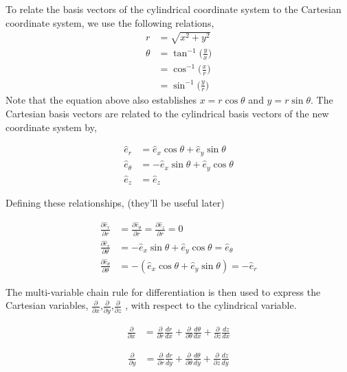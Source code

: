 To relate the basis vectors of the cylindrical coordinate system to the Cartesian coordinate system, we use the following relations,
\begin{align*}
	r 
	&= \sqrt{x^2 + y^2} \\
	\theta 
	&= \tan^{-1} \Big( \frac{y}{x} \Big) \\
	&= \cos^{-1} \Big( \frac{x}{r} \Big) \\
	&=\sin^{-1} \Big( \frac{y}{r} \Big)		
\end{align*}
	Note that the equation above also establishes $x   = r\cos \theta$ and $y = r\sin\theta$. The Cartesian basis vectors are related to the cylindrical basis vectors of the new coordinate system by,

\begin{align*}
	\hat{e}_r 
	&= \hat{e}_x \cos \theta + \hat{e}_y \sin \theta \\
	\hat{e}_{\theta} 
	&= -\hat{e}_x \sin \theta + \hat{e}_y \cos \theta \\
	\hat{e}_z 	 
	&= \hat{e}_z %
\end{align*}

Defining these relationships, (they'll be useful later)

\begin{align*}
	\frac{\partial \hat{e}_{r	  }}{\partial r} 
	&= \frac{\partial \hat{e}_{\theta}}{\partial r} 
	= \frac{\partial \hat{e}_{z}	   }{\partial r} = 0 \\
	\frac{\partial \hat{e}_{r	  }}{\partial \theta} 
	&=	-\hat{e}_x \sin \theta + \hat{e}_y \cos \theta                = \hat{e}_{\theta}\\
	\frac{\partial \hat{e}_{\theta	  }}{\partial \theta}
	&= -\left(
	\hat{e}_x \cos \theta + \hat{e}_y \sin \theta
	\right) = 
	-\hat{e}_{r}
\end{align*}

The multi-variable chain rule for differentiation is then used to express the Cartesian variables, $\frac{\partial}{\partial x}$,$\frac{\partial}{\partial y}$,$\frac{\partial}{\partial z}$ , with respect to the cylindrical variable.

\begin{align*}
	\frac{\partial }{\partial x}
	&= \frac{\partial }{\partial r}\frac{d r}{d x} +
	\frac{\partial }{\partial \theta}\frac{d \theta}{d x} +
	\frac{\partial }{\partial z}\frac{d z}{d x} 
\end{align*}

\begin{align*}
	\frac{\partial }{\partial y}
	&=
	\frac{\partial }{\partial r} 	 \frac{d r}{d y} +
	\frac{\partial }{\partial \theta} \frac{d \theta}{d y} + \frac{\partial }{\partial z}     \frac{d z}{d y}
\end{align*}


